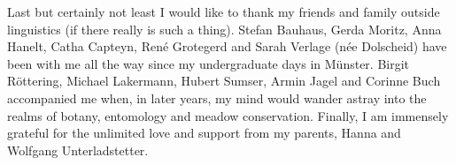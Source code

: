 Last but certainly not least I would like to thank my friends and family outside linguistics (if there really is such a thing). Stefan Bauhaus, Gerda Moritz, Anna Hanelt, Catha Capteyn, René Grotegerd and Sarah Verlage (née Dolscheid) have been with me all the way since my undergraduate days in Münster. Birgit Röttering, Michael Lakermann, Hubert Sumser, Armin Jagel and Corinne Buch accompanied me when, in later years, my mind would wander astray into the realms of botany, entomology and meadow conservation. Finally, I am immensely grateful for the unlimited love and support from my parents, Hanna and Wolfgang Unterladstetter.

